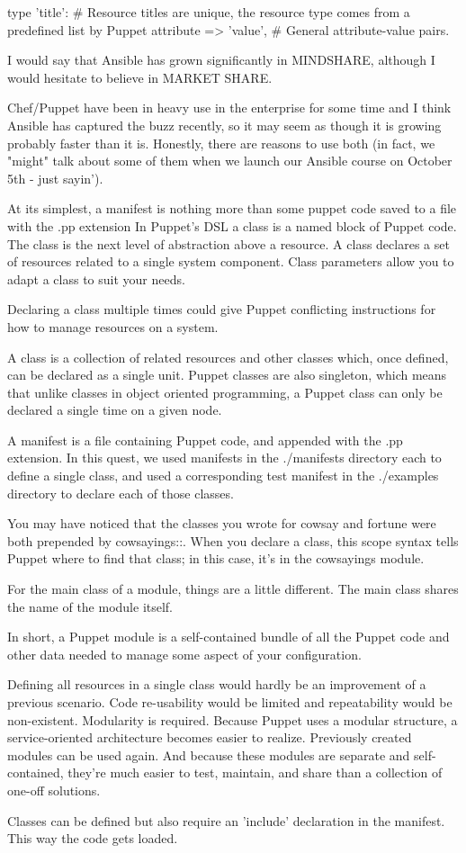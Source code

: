 type {'title': # Resource titles are unique, the resource type comes from a predefined list by Puppet
    attribute => 'value', # General attribute-value pairs. 
}

I would say that Ansible has grown significantly in MINDSHARE, although I would hesitate to believe in MARKET SHARE.

Chef/Puppet have been in heavy use in the enterprise for some time and I think Ansible has captured the buzz recently, so it may seem as though it is growing probably faster than it is. Honestly, there are reasons to use both (in fact, we "might" talk about some of them when we launch our Ansible course on October 5th - just sayin'). 

At its simplest, a manifest is nothing more than some puppet code saved to a file with the .pp extension
In Puppet's DSL a class is a named block of Puppet code. The class is the next level of abstraction above a resource. A class declares a set of resources related to a single system component. Class parameters allow you to adapt a class to suit your needs. 

Declaring a class multiple times could give Puppet conflicting instructions for how to manage resources on a system.

A class is a collection of related resources and other classes which, once defined, can be declared as a single unit. Puppet classes are also singleton, which means that unlike classes in object oriented programming, a Puppet class can only be declared a single time on a given node.

A manifest is a file containing Puppet code, and appended with the .pp extension. In this quest, we used manifests in the ./manifests directory each to define a single class, and used a corresponding test manifest in the ./examples directory to declare each of those classes.

You may have noticed that the classes you wrote for cowsay and fortune were both prepended by cowsayings::. When you declare a class, this scope syntax tells Puppet where to find that class; in this case, it's in the cowsayings module.

For the main class of a module, things are a little different. The main class shares the name of the module itself.

In short, a Puppet module is a self-contained bundle of all the Puppet code and other data needed to manage some aspect of your configuration.

Defining all resources in a single class would hardly be an improvement of a previous scenario. Code re-usability would be limited and repeatability would be non-existent. Modularity is required. Because Puppet uses a modular structure, a service-oriented architecture becomes easier to realize. Previously created modules can be used again. And because these modules are separate and self-contained, they're much easier to test, maintain, and share than a collection of one-off solutions.

Classes can be defined but also require an 'include' declaration in the manifest. This way the code gets loaded. 

